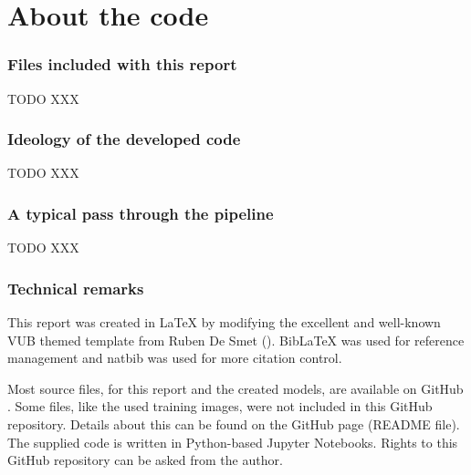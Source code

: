 \part{About the code}
\label{part:about_the_code}


\section{Files included with this report}
\label{section:inc_files}
TODO XXX

\section{Ideology of the developed code}
\label{section:ideology_dev_code}
TODO XXX

\section{A typical pass through the pipeline}
\label{section:typical_pass_through_pipeline}
TODO XXX


\section{Technical remarks}
\label{section:technical_remarks}

This report was created in \LaTeX{} by modifying the excellent and well-known VUB themed template from Ruben De Smet (\citeyear{latex_template}). BibLaTeX was used for reference management and natbib was used for more citation control. 

Most source files, for this report and the created models, are available on GitHub \citep{github_project}. Some files, like the used training images, were not included in this GitHub repository. Details about this can be found on the GitHub page (README file). The supplied code is written in Python-based Jupyter Notebooks. Rights to this GitHub repository can be asked from the author.